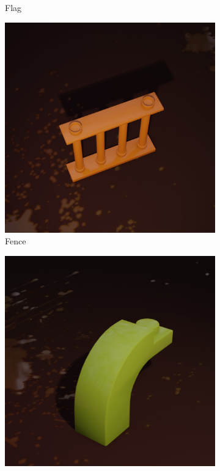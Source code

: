 \documentclass[]{article}
\begin{document}
\begin{figure}[h]
\begin{subfigure}[b]{0.15\textwidth}
        \caption{Flag}
    \end{subfigure}
    \begin{subfigure}[b]{0.15\textwidth}
        \centering
        \includegraphics[width=\textwidth]{Examples/fence.jpg}
        \caption{Fence}
    \end{subfigure}
    \begin{subfigure}[b]{0.15\textwidth}
        \centering
        \includegraphics[width=\textwidth]{Examples/arch-1.jpg}

\end{subfigure}
\end{figure}
\end{document}
